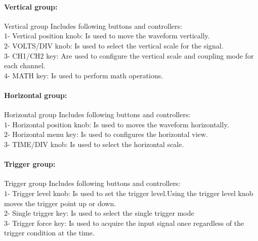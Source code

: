 \documentclass[11pt]{article}
\begin{document}
\begin{question}
{        \paragraph*{Vertical group:}
        Vertical group Includes following buttons and controllers: \\
        $1$- Vertical position knob: Is used to move the waveform vertically. \\
        $2$- VOLTS/DIV knob: Is used to select the vertical scale for the signal. \\
        $3$- CH1/CH2 key: Are used to configure the vertical scale and coupling mode for each channel. \\
        $4$- MATH key: Is used to perform math operations.

        \paragraph*{Horizontal group:}
        Horizontal group Includes following buttons and controllers: \\
        $1$- Horizontal position knob: Is used to moves the waveform horizontally. \\
        $2$- Horizontal menu key: Is used to configures the horizontal view. \\
        $3$- TIME/DIV knob: Is used to select the horizontal scale. \\

        \paragraph*{Trigger group:}
        Trigger group Includes following buttons and controllers: \\
        $1$- Trigger level knob: Is used to set the trigger level.Using the trigger level knob moves the trigger point up or down.  \\
        $2$- Single trigger key: Is used to select the single trigger mode \\
        $3$- Trigger force key: Is used to acquire the input signal once regardless of the trigger condition at the time. \\
    }

\end{question}

\end{document}
